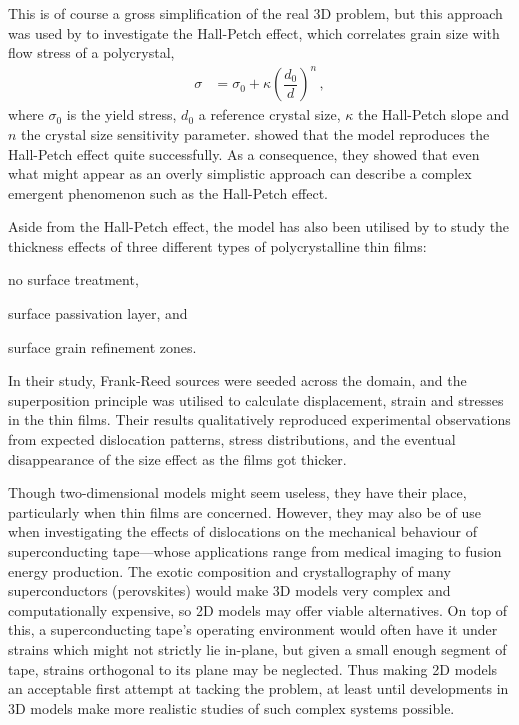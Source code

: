 This is of course a gross simplification of the real 3D problem, but this approach was used by \citet{2d_pcm} to investigate the Hall-Petch effect, which correlates grain size with flow stress of a polycrystal,
\begin{align}\label{eq:hall_petch}
    \sigma & = \sigma_{0} + \kappa \left(\dfrac{d_{0}}{d}\right)^{n}\,,
\end{align}
where $ \sigma_{0} $ is the yield stress, $ d_{0} $ a reference crystal size, $ \kappa $ the Hall-Petch slope and $ n $ the crystal size sensitivity parameter.  showed that the model reproduces the Hall-Petch effect quite successfully. As a consequence, they showed that even what might appear as an overly simplistic approach can describe a complex emergent phenomenon such as the Hall-Petch effect.

Aside from the Hall-Petch effect, the model has also been utilised by \citet{2d_pcm2} to study the thickness effects of three different types of polycrystalline thin films:
\begin{inparaenum}[\itshape 1\upshape )]
    \item no surface treatment,
    \item surface passivation layer, and
    \item surface grain refinement zones.
\end{inparaenum}
In their study, Frank-Reed sources were seeded across the domain, and the superposition principle was utilised to calculate displacement, strain and stresses in the thin films. Their results qualitatively reproduced experimental observations from expected dislocation patterns, stress distributions, and the eventual disappearance of the size effect as the films got thicker.

Though two-dimensional models might seem useless, they have their place, particularly when thin films are concerned. However, they may also be of use when investigating the effects of dislocations on the mechanical behaviour of superconducting tape---whose applications range from medical imaging to fusion energy production. The exotic composition and crystallography of many superconductors (perovskites) would make 3D models very complex and computationally expensive, so 2D models may offer viable alternatives. On top of this, a superconducting tape's operating environment would often have it under strains which might not strictly lie in-plane, but given a small enough segment of tape, strains orthogonal to its plane may be neglected. Thus making 2D models an acceptable first attempt at tacking the problem, at least until developments in 3D models make more realistic studies of such complex systems possible.

